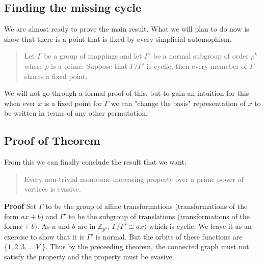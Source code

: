 \documentclass[letterpaper,12pt]{article}
\begin{document}
\subsection{Finding the missing cycle}

We are almost ready to prove the main result. What we will plan to do now is show that there is a point that is fixed by every simplicial automophism.

\begin{quote}
    Let $\Gamma$ be a group of mappings and let $\Gamma'$ be a normal subgroup of order $p^k$ where $p$ is a prime. Suppose that $\Gamma/\Gamma'$ is cyclic, then every memeber of $\Gamma$ shares a fixed point.
\end{quote}

We will not go through a formal proof of this, but to gain an intuition for this when ever $x$ is a fixed point for $\Gamma$ we can "change the basis" representation of $x$ to be written in terms of any other permutation.

\subsection{Proof of Theorem}

From this we can finally conclude the result that we want:

\begin{quote}
    Every non-trivial monotone increasing property over a prime power of vertices is evasive.
\end{quote}

\textbf{Proof} Set $\Gamma$ to be the group of affine transformations (transformations of the form $ax + b$) and $\Gamma'$ to be the subgroup of translations (transformations of the form$x + b$). As $a$ and $b$ are in $\mathbb{Z}_{p^k}$, $\Gamma/\Gamma' \cong ax)$ which is cyclic. We leave it as an exercise to show that it is $\Gamma'$ is normal. But the orbits of these functions are $\{ 1, 2, 3, \ldots |V| \}$. Thus by the preceeding theorem, the connected graph must not satisfy the property and the property must be evasive.
\end{document}

